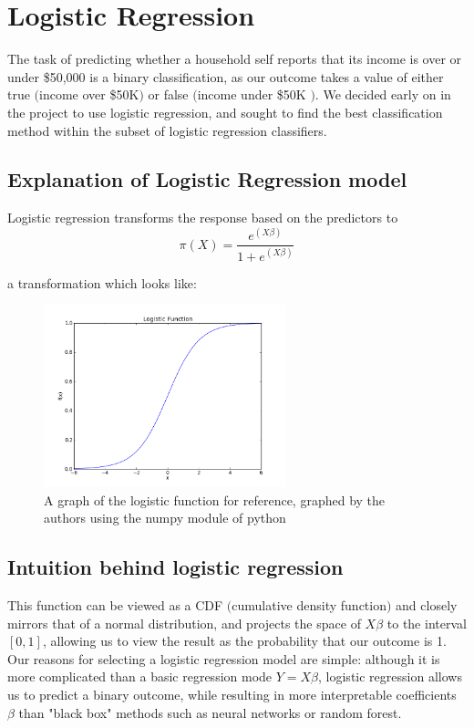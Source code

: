 \documentclass[11pt]{article}
\begin{document}
\section{ Logistic Regression}
The task of predicting whether a household self reports that its income is over or under \$50,000 is a binary classification, as our outcome takes a value of either true $($income over \$50K$)$ or false $($income under \$50K $)$.  We decided early on in the project to use logistic regression, and sought to find the best classification method within the subset of logistic regression classifiers. 

\subsection{Explanation of Logistic Regression model}
Logistic regression transforms the response based on the predictors to
\begin{equation}
\pi(X) = \frac{e^{(X\beta)}}{1+e^{(X\beta)}}
\end{equation}

a transformation which looks like:
\begin{figure}[H]	
\centering
\includegraphics[width = 7cm]{logisticfunction.png}
\caption{A graph of the logistic function for reference, graphed by the authors using the numpy module of python}
\end{figure}

\subsection{Intuition behind logistic regression}
This function can be viewed as a CDF $($cumulative density function$)$ and closely mirrors that of a normal distribution, and projects the space of $X \beta$ to the interval $[0,1]$, allowing us to view the result as the probability that our outcome is 1. Our reasons for selecting a logistic regression model are simple: although it is more complicated than a basic regression mode $Y = X\beta$, logistic regression allows us to predict a binary outcome, while resulting in more interpretable coefficients $\beta$ than "black box" methods such as neural networks or random forest. 
\end{document}
